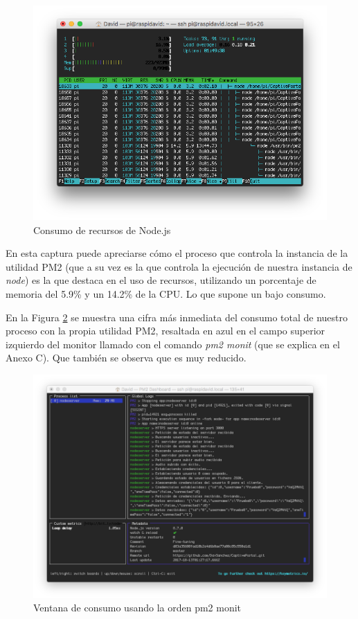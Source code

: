 \begin{figure}[!t]
\begin{center}
\includegraphics[width=0.75\linewidth]{./6_EvalEmpirica/Img/htopNode.png}
\end{center}
\caption{Consumo de recursos de Node.js}
\label{htopNode}
\end{figure}

En esta captura puede apreciarse cómo el proceso que controla la instancia de la utilidad PM2 (que a su vez es la que controla la ejecución de nuestra instancia de \emph{node}) es la que destaca en el uso de recursos, utilizando un porcentaje de memoria del 5.9\% y un 14.2\% de la CPU. Lo que supone un bajo consumo.

En la Figura \ref{pm2monitNode} se muestra una cifra más inmediata del consumo total de nuestro proceso con la propia utilidad PM2, resaltada en azul en el campo superior izquierdo del monitor llamado con el comando \emph{pm2 monit} (que se explica en el Anexo C). Que también se observa que es muy reducido.

\begin{figure}[!t]
\begin{center}
\includegraphics[width=0.75\linewidth]{./6_EvalEmpirica/Img/pm2monitNode.png}
\end{center}
\caption{Ventana de consumo usando la orden pm2 monit}
\label{pm2monitNode}
\end{figure}


